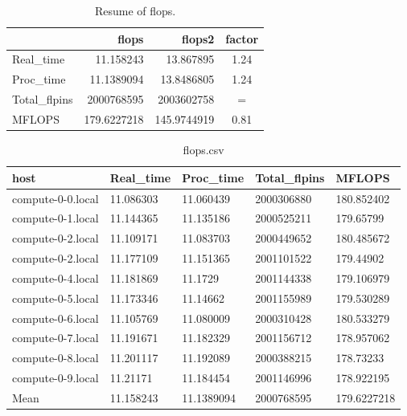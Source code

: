 \documentclass[12pt]{article}
\begin{document}
\begin{table}[h!]
	\centering
\begin{tabular}{|l|r|r|c|}
	\hline
	& flops & flops2 & factor \\
	\hline
	Real\_time & 11.158243 & 13.867895 & 1.24 \\
	\hline
	Proc\_time & 11.1389094 & 13.8486805 & 1.24 \\
	\hline
	Total\_flpins & 2000768595 & 2003602758 & = \\
	\hline
	MFLOPS & 179.6227218 & 145.9744919 & 0.81 \\
	\hline
\end{tabular}
	\caption{Resume of flops.}
\label{tab:flopsresume}
\end{table}

\begin{table}[h!]
	\centering
	\begin{tabular}{|l|l|l|l|l|}
		\hline
		host & Real\_time & Proc\_time & Total\_flpins & MFLOPS \\
		\hline
		compute-0-0.local & 11.086303 & 11.060439 & 2000306880 & 180.852402 \\
		compute-0-1.local & 11.144365 & 11.135186 & 2000525211 & 179.65799 \\
		compute-0-2.local & 11.109171 & 11.083703 & 2000449652 & 180.485672 \\
		compute-0-2.local & 11.177109 & 11.151365 & 2001101522 & 179.44902 \\
		compute-0-4.local & 11.181869 & 11.1729 & 2001144338 & 179.106979 \\
		compute-0-5.local & 11.173346 & 11.14662 & 2001155989 & 179.530289 \\
		compute-0-6.local & 11.105769 & 11.080009 & 2000310428 & 180.533279 \\
		compute-0-7.local & 11.191671 & 11.182329 & 2001156712 & 178.957062 \\
		compute-0-8.local & 11.201117 & 11.192089 & 2000388215 & 178.73233 \\
		compute-0-9.local & 11.21171 & 11.184454 & 2001146996 & 178.922195 \\
		\hline
		\hline
		Mean & 11.158243 & 11.1389094 & 2000768595 & 179.6227218 \\
		\hline
	\end{tabular}
	\caption{flops.csv}
	\label{tab:flops}
\end{table}

\newpage
\end{document}
